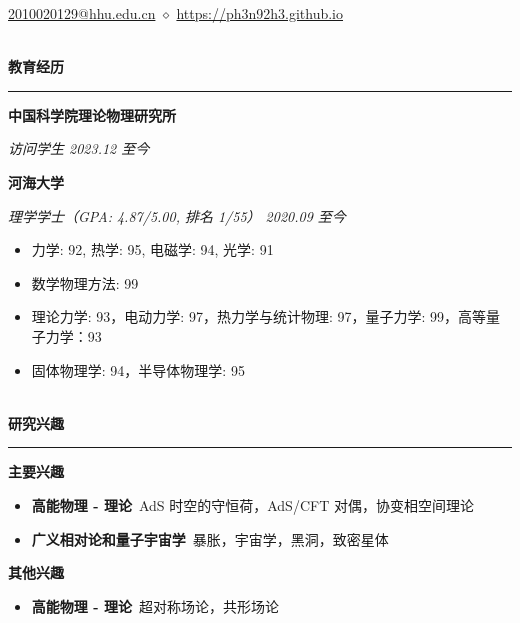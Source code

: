 \documentclass[12pt]{article}
\renewcommand*{\section}[1]{
    ~\\ \noindent \textbf{#1} \medskip \hrule \medskip
}
\begin{document}
\pagestyle{empty}


\begin{center}
    \LARGE{\textbf{}}
\end{center}

\begin{center}
    \href{mailto:2010020129@hhu.edu.cn}{2010020129@hhu.edu.cn} $\diamond$ \href{https://ph3n92h3.github.io}{https://ph3n92h3.github.io}
\end{center}


\section{教育经历}

\textbf{中国科学院理论物理研究所}

\smallskip \quad \textit{访问学生 \hfill 2023.12 至今}

\bigskip

\textbf{河海大学}

\smallskip \quad \textit{理学学士（GPA: 4.87/5.00, 排名 1/55） \hfill 2020.09 至今}

\begin{itemize}
    \item 力学: 92, 热学: 95, 电磁学: 94, 光学: 91
    \item 数学物理方法: 99
    \item 理论力学: 93，电动力学: 97，热力学与统计物理: 97，量子力学: 99，高等量子力学：93
    \item 固体物理学: 94，半导体物理学: 95
\end{itemize}


\section{研究兴趣}

\textbf{主要兴趣}
\begin{itemize}
    \item \textbf{高能物理 - 理论}\ AdS 时空的守恒荷，AdS/CFT 对偶，协变相空间理论
    \item \textbf{广义相对论和量子宇宙学}\ 暴胀，宇宙学，黑洞，致密星体
\end{itemize}

\textbf{其他兴趣}
\begin{itemize}
    \item \textbf{高能物理 - 理论}\ 超对称场论，共形场论
\end{itemize}
\end{document}
